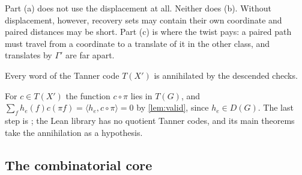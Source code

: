 Part (a) does not use the displacement at all. Neither does (b). Without displacement, however, recovery sets may
contain their own coordinate and paired distances may be short. Part (c) is where the twist pays: a paired path must
travel from a coordinate to a translate of it in the other class, and translates by $\Gamma'$ are far apart.

\begin{lemma}\label{lem:valid-quotient}
\notformalized
Every word of the Tanner code $T(X')$ is annihilated by the descended checks.
\end{lemma}
\begin{informalproof}
For $c\in T(X')$ the function $c\circ\pi$ lies in $T(G)$, and $\sum_fh_e(f)c(\pi f)=\langle h_e,c\circ\pi\rangle=0$ by
\cref{lem:valid}, since $h_e\in D(G)$. The last step is ; the Lean library
has no quotient Tanner codes, and its main theorems take the annihilation as a hypothesis.
\end{informalproof}

\subsection{The combinatorial core}\label{sec:descent-core}

